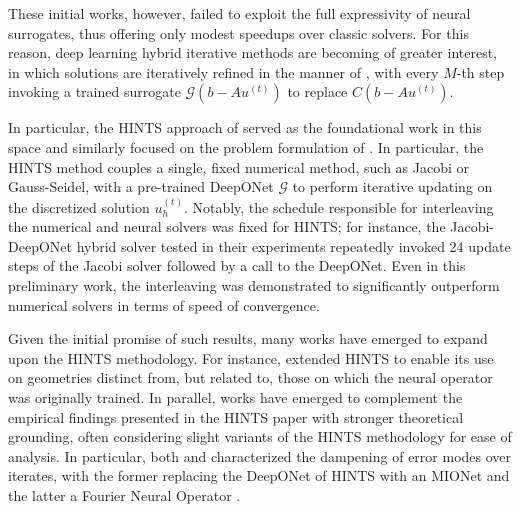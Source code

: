\documentclass{article} %
\begin{document}
These initial works, however, failed to exploit the full expressivity of neural surrogates, thus offering only modest speedups over classic solvers. For this reason, deep learning hybrid iterative methods are becoming of greater interest, in which solutions are iteratively refined in the manner of , with every $M$-th step invoking a trained surrogate $\mathcal{G}\left(b - Au^{(t)}\right)$ to replace $C\left(b - Au^{(t)}\right)$.


In particular, the HINTS approach of \citep{zhang2024blending} served as the foundational work in this space and similarly focused on the problem formulation of . In particular, the HINTS method couples a single, fixed numerical method, such as Jacobi or Gauss-Seidel, with a pre-trained DeepONet $\mathcal{G}$ to perform iterative updating on the discretized solution $u^{\left(t\right)}_h$. 
Notably, the schedule responsible for interleaving the numerical and neural solvers was fixed for HINTS; for instance, the Jacobi-DeepONet hybrid solver tested in their experiments repeatedly invoked 24 update steps of the Jacobi solver followed by a call to the DeepONet. Even in this preliminary work, the interleaving was demonstrated to significantly outperform numerical solvers in terms of speed of convergence. 

Given the initial promise of such results, many works have emerged to expand upon the HINTS methodology. For instance, \citep{kahana2023geometry} extended HINTS to enable its use on geometries distinct from, but related to, those on which the neural operator was originally trained. In parallel, works have emerged to complement the empirical findings presented in the HINTS paper with stronger theoretical grounding, often considering slight variants of the HINTS methodology for ease of analysis. In particular, both \citep{hu2025hybrid} and \citep{cui2022fourier} characterized the dampening of error modes over iterates, with the former replacing the DeepONet of HINTS with an MIONet \citep{jin2022mionet} and the latter a Fourier Neural Operator \citep{li2020fourier}.
\end{document}
